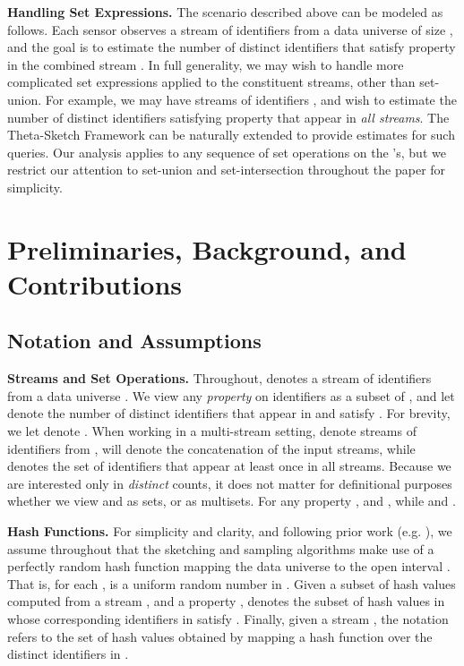 \documentclass{article}
\begin{document}
\medskip
\noindent \textbf{Handling Set Expressions.}
\label{sec:setexpressions}
The scenario described above can be modeled as follows. Each sensor observes a stream of identifiers  from a data universe of size , and the goal
is to estimate the number of distinct identifiers that satisfy property  in the combined stream . In full generality, we may wish to handle more complicated set expressions applied to the constituent streams, other than set-union. For example, we may have  streams of identifiers , and wish to estimate 
the number of distinct identifiers satisfying property  that appear in \emph{all streams}. The Theta-Sketch Framework can be naturally extended to provide estimates for such queries. Our analysis applies to any sequence of set operations on the 's, but we restrict our attention to set-union and set-intersection throughout the paper for simplicity. 

\section{Preliminaries, Background, and Contributions}
\subsection{Notation and Assumptions}
\noindent \textbf{Streams and Set Operations.}
Throughout,  denotes a stream of identifiers from a data universe . We view any \emph{property}  on identifiers
as a subset of , and let  denote the number of distinct identifiers that appear in  and satisfy .
For brevity, we let  denote . When working in a multi-stream setting,  denote  streams of identifiers from ,  will denote the concatenation of the  input streams,
while  denotes the set of identifiers that appear at least once in all  streams. Because we are interested only in \emph{distinct} counts, 
it does not matter for definitional purposes whether we view  and  as sets, or as multisets. 
For any property ,  and , while  and .

\medskip
\noindent \textbf{Hash Functions.} \label{sec:hashprelims}
For simplicity and clarity, and following prior work (e.g. \cite{beyer2009distinct, cohen2009leveraging}), we assume throughout that the sketching and sampling algorithms make use of a perfectly random hash function 
mapping the data universe  to the open interval . That is, for each ,  is a uniform random number in . Given a subset of hash values  computed from a stream , and a property ,
 denotes the subset of hash values in  whose corresponding identifiers in  satisfy .
Finally, given a stream , the notation  refers to the set of hash values obtained by mapping 
a hash function  over the  distinct identifiers in .
\end{document}
